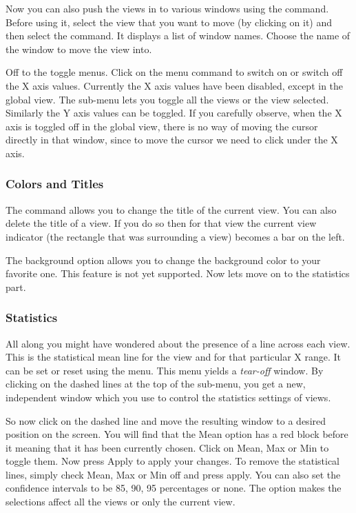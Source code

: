 Now you can also push the views in to various windows using the
 command. Before using it, select the view that
you want to move (by clicking on it) and then select the command. It
displays a list of window names. Choose the name of the window to move
the view into.

Off to the toggle menus. Click on the  menu
command to switch on or switch off the X axis values. Currently the X
axis values have been disabled, except in the global view. The
sub-menu  lets you toggle all the views
or the view selected. Similarly the Y axis values can be toggled. If
you carefully observe, when the X axis is toggled off in the global
view, there is no way of moving the cursor directly in that window,
since to move the cursor we need to click under the X axis.

\subsubsection{Colors and Titles}

The  command allows you to change the title of the current
view. You can also delete the title of a view. If you do so then for
that view the current view indicator (the rectangle that was
surrounding a view) becomes a bar on the left.

The background option allows you to change the background color to
your favorite one. This feature is not yet supported. Now lets move on
to the statistics part.

\subsubsection{Statistics}

All along you might have wondered about the presence of a line across
each view. This is the statistical mean line for the view and for that
particular X range. It can be set or reset using the
 menu. This menu yields a {\em tear-off}
window. By clicking on the dashed lines at the top of the sub-menu,
you get a new, independent window which you use to control the
statistics settings of views.

So now click on the dashed line and move the resulting window to a
desired position on the screen. You will find that the Mean option has
a red block before it meaning that it has been currently chosen. Click
on Mean, Max or Min to toggle them. Now press Apply to apply your
changes. To remove the statistical lines, simply check Mean, Max or
Min off and press apply. You can also set the confidence intervals to
be 85, 90, 95 percentages or none. The 
option makes the selections affect all the views or only the current
view.

